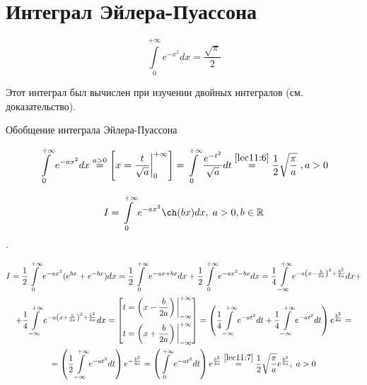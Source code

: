 \documentclass[../../main.tex]{subfiles}
\begin{document}
	\section{Интеграл Эйлера-Пуассона}
	
	\begin{equation}\label{lec11:6}
		\int\limits_0^{+\infty} e^{-x^2} dx = \frac{\sqrt{\pi}}{2}
	\end{equation}
	
	Этот интеграл был вычислен при изучении двойных интегралов (см. доказательство). 
	
	Обобщение интеграла Эйлера-Пуассона
	
	\begin{equation}\label{lec11:7}
		\int\limits_0^{+\infty} e^{-ax^2} dx \overset{a > 0}{=} \left[ x = \frac{t}{\sqrt{a}} \bigg|_0^{+\infty} \right] = \int\limits_0^{+\infty} \frac{e^{-t^2}}{\sqrt{a}} dt \overset{\eqref{lec11:6}}{=} \frac{1}{2} \sqrt{\frac{\pi}{a}} \;, a > 0
	\end{equation}
	
	\begin{exmp}
		$$
		I = \int\limits_0^{+\infty} e^{-ax^2} \ch (bx) dx, 
		\; a > 0, b \in \R
		$$.
		
		\begin{equation*}
			\begin{gathered}
				I = \frac{1}{2} \int\limits_0^{+\infty} e^{-ax^2} (e^{bx} + e^{-bx}) dx = \frac{1}{2} \int\limits_0^{+\infty} e^{-ax + bx} dx + \frac{1}{2} \int\limits_0^{+\infty} e^{-ax^2 - bx} dx = \frac{1}{4} \int\limits_{-\infty}^{+\infty} e^{-a \left( x - \frac{b}{2a} \right)^2 + \frac{b^2}{4a}} dx + \\
				+ \frac{1}{4} \int\limits_{-\infty}^{+\infty} e^{-a \left( x + \frac{b}{2a} \right)^2 + \frac{b^2}{4a}} dx = 
				\left[ 
					\begin{gathered}
						t = \left( x - \frac{b}{2a} \right) \bigg|_{-\infty}^{+\infty} \\
						t = \left( x + \frac{b}{2a} \right) \bigg|_{-\infty}^{+\infty}
					\end{gathered}
				\right] 
				= \left( \frac{1}{4} \int\limits_{-\infty}^{+\infty} e^{-at^2} dt + \frac{1}{4} \int\limits_{-\infty}^{+\infty} e^{-at^2} dt \right) e^{\frac{b^2}{4a}} = \\
				= \left( \frac{1}{2} \int\limits_{-\infty}^{+\infty} e^{-at^2} dt \right) e^{-\frac{b^2}{4a}} = \left( \int\limits_0^{+\infty} e^{-at^2} dt \right) e^{\frac{b^2}{4a}} \overset{\eqref{lec11:7}}{=} \frac{1}{2} \sqrt{\frac{\pi}{a}} e^{\frac{b^2}{4a}}, \; a > 0
			\end{gathered}
		\end{equation*}
	\end{exmp}
\end{document}
